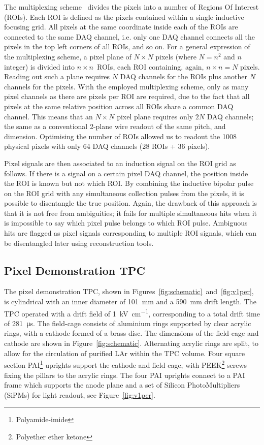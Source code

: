 \documentclass[instruments,article,submit,moreauthors,pdftex]{Definitions/mdpi}
\begin{document}
The multiplexing scheme~\cite{maplesyrup} divides the pixels into a number of Regions Of Interest (ROIs).
Each ROI is defined as the pixels contained within a single inductive focusing grid.
All pixels at the same coordinate inside each of the ROIs are connected to the same DAQ channel, i.e. only one DAQ channel connects all the pixels in the top left corners of all ROIs, and so on. 
For a general expression of the multiplexing scheme, a pixel plane of $N \times N$ pixels (where $N = n ^ 2$ and $n$ integer) is divided into $n \times n$~ROIs, each ROI containing, again, $n \times n = N$ pixels.
Reading out such a plane requires $N$ DAQ channels for the ROIs plus another $N$ channels for the pixels.
With the employed multiplexing scheme, only as many pixel channels as there are pixels per ROI are required, due to the fact that all pixels at the same relative position across all ROIs share a common DAQ channel.
This means that an $N \times N$ pixel plane requires only $2 N$ DAQ channels; the same as a conventional 2-plane wire readout of the same pitch, and dimension.
Optimising the number of ROIs allowed us to readout the 1008 physical pixels with only 64 DAQ channels (28 ROIs + 36 pixels).

Pixel signals are then associated to an induction signal on the ROI grid as follows. 
If there is a signal on a certain pixel DAQ channel, the position inside the ROI is known but not which ROI.
By combining the inductive bipolar pulse on the ROI grid with any simultaneous collection pulses from the pixels, it is possible to disentangle the true position.
Again, the drawback of this approach is that it is not free from ambiguities; it fails for multiple simultaneous hits when it is impossible to say which pixel pulse belongs to which ROI pulse.
Ambiguous hits are flagged as pixel signals corresponding to multiple ROI signals, which can be disentangled later using reconstruction tools. 

\subsection{Pixel Demonstration TPC} \label{sec:viper}

The pixel demonstration TPC, shown in Figures~\ref{fig:schematic}~and~\ref{fig:v1per}, is cylindrical with an inner diameter of \SI{101}{\milli\metre} and a \SI{590}{\milli\metre} drift length. 
The TPC operated with a drift field of \SI{1}{\kilo\volt\per\centi\metre}, corresponding to a total drift time of \SI{281}{\micro\second}. 
The field-cage consists of aluminium rings supported by clear acrylic rings, with a cathode formed of a brass disc. 
The dimensions of the field-cage and cathode are shown in Figure~\ref{fig:schematic}.
Alternating acrylic rings are split, to allow for the circulation of purified LAr within the TPC volume.
Four square section PAI\footnote{Polyamide-imide} uprights support the cathode and field cage, with PEEK\footnote{Polyether ether ketone} screws fixing the pillars to the acrylic rings.
The four PAI uprights connect to a PAI frame which supports the anode plane and a set of  Silicon PhotoMultipliers (SiPMs) for light readout, see Figure~\ref{fig:v1per}. 
\end{document}
